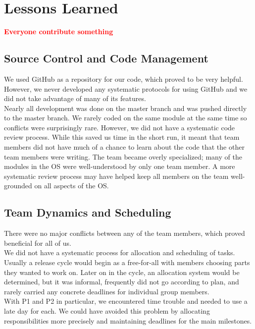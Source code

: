 \documentclass[12pt]{report}
\begin{document}
\chapter{Lessons Learned}

\textcolor{red}{\textbf{Everyone contribute something}} \\

\section{Source Control and Code Management}

We used GitHub as a repository for our code, which proved to be very helpful. However, we never developed any systematic protocols for using GitHub and we did not take advantage of many of its features.\\

Nearly all development was done on the master branch and was pushed directly to the master branch. We rarely coded on the same module at the same time so conflicts were surprisingly rare. However, we did not have a systematic code review process. While this saved us time in the short run, it meant that team members did not have much of a chance to learn about the code that the other team members were writing. The team became overly specialized; many of the modules in the OS were well-understood by only one team member. A more systematic review process may have helped keep all members on the team well-grounded on all aspects of the OS.\\

\section{Team Dynamics and Scheduling}

There were no major conflicts between any of the team members, which proved beneficial for all of us.\\

We did not have a systematic process for allocation and scheduling of tasks. Usually a release cycle would begin as a free-for-all with members choosing parts they wanted to work on. Later on in the cycle, an allocation system would be determined, but it was informal, frequently did not go according to plan, and rarely carried any concrete deadlines for individual group members.\\

With P1 and P2 in particular, we encountered time trouble and needed to use a late day for each. We could have avoided this problem by allocating responsibilities more precisely and maintaining deadlines for the main milestones.\\
\end{document}
